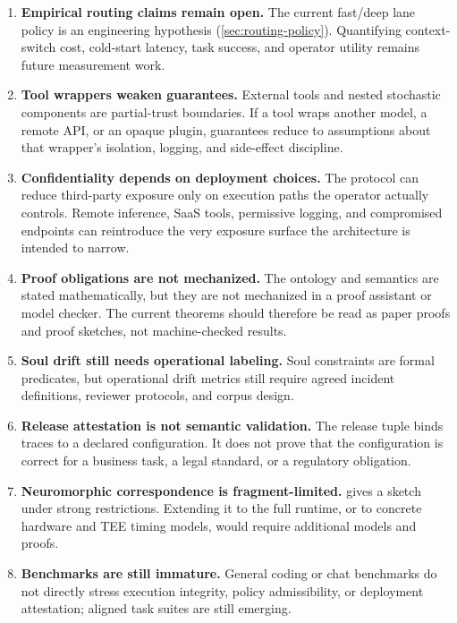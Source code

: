 \documentclass[11pt]{article}
\theoremstyle{remark}
\begin{document}
\begin{enumerate}[leftmargin=1.5em]
    \item \textbf{Empirical routing claims remain open.} The current fast/deep lane policy is an engineering hypothesis (\cref{sec:routing-policy}). Quantifying context-switch cost, cold-start latency, task success, and operator utility remains future measurement work.
    \item \textbf{Tool wrappers weaken guarantees.} External tools and nested stochastic components are partial-trust boundaries. If a tool wraps another model, a remote API, or an opaque plugin, guarantees reduce to assumptions about that wrapper's isolation, logging, and side-effect discipline.
    \item \textbf{Confidentiality depends on deployment choices.} The protocol can reduce third-party exposure only on execution paths the operator actually controls. Remote inference, SaaS tools, permissive logging, and compromised endpoints can reintroduce the very exposure surface the architecture is intended to narrow.
    \item \textbf{Proof obligations are not mechanized.} The ontology and semantics are stated mathematically, but they are not mechanized in a proof assistant or model checker. The current theorems should therefore be read as paper proofs and proof sketches, not machine-checked results.
    \item \textbf{Soul drift still needs operational labeling.} Soul constraints are formal predicates, but operational drift metrics still require agreed incident definitions, reviewer protocols, and corpus design.
    \item \textbf{Release attestation is not semantic validation.} The release tuple binds traces to a declared configuration. It does not prove that the configuration is correct for a business task, a legal standard, or a regulatory obligation.
    \item \textbf{Neuromorphic correspondence is fragment-limited.}  gives a sketch under strong restrictions. Extending it to the full runtime, or to concrete hardware and TEE timing models, would require additional models and proofs.
    \item \textbf{Benchmarks are still immature.} General coding or chat benchmarks do not directly stress execution integrity, policy admissibility, or deployment attestation; aligned task suites are still emerging.
\end{enumerate}
\end{document}
